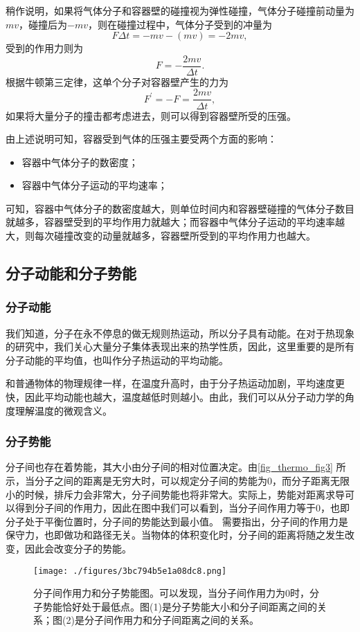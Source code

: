 稍作说明，如果将气体分子和容器壁的碰撞视为弹性碰撞，气体分子碰撞前动量为$mv$，碰撞后为$-mv$，则在碰撞过程中，气体分子受到的冲量为$$F\Delta t=-mv-(mv)=-2mv,$$受到的作用力则为$$F=-\dfrac{2mv}{\Delta t}.$$根据牛顿第三定律，这单个分子对容器壁产生的力为$$F^\prime=-F=\dfrac{2mv}{\Delta t},$$如果将大量分子的撞击都考虑进去，则可以得到容器壁所受的压强。

由上述说明可知，容器受到气体的压强主要受两个方面的影响：
\begin{itemize}
\item 容器中气体分子的数密度；
\item 容器中气体分子运动的平均速率；
\end{itemize}
可知，容器中气体分子的数密度越大，则单位时间内和容器壁碰撞的气体分子数目就越多，容器壁受到的平均作用力就越大；而容器中气体分子运动的平均速率越大，则每次碰撞改变的动量就越多，容器壁所受到的平均作用力也越大。
\subsection{分子动能和分子势能}
\subsubsection{分子动能}
我们知道，分子在永不停息的做无规则热运动，所以分子具有动能。在对于热现象的研究中，我们关心大量分子集体表现出来的热学性质，因此，这里重要的是所有分子动能的平均值，也叫作分子热运动的平均动能。

和普通物体的物理规律一样，在温度升高时，由于分子热运动加剧，平均速度更快，因此平均动能也越大，温度越低时则越小。由此，我们可以从分子动力学的角度理解温度的微观含义。

\subsubsection{分子势能}
分子间也存在着势能，其大小由分子间的相对位置决定。由\autoref{fig_thermo_fig3} 所示，当分子之间的距离是无穷大时，可以规定分子间的势能为$0$，而分子距离无限小的时候，排斥力会非常大，分子间势能也将非常大。实际上，势能对距离求导可以得到分子间的作用力，因此在图中我们可以看到，当分子间作用力等于$0$，也即分子处于平衡位置时，分子间的势能达到最小值。
需要指出，分子间的作用力是保守力，也即做功和路径无关。当物体的体积变化时，分子间的距离将随之发生改变，因此会改变分子的势能。

\begin{figure}[ht]
\centering
\texttt{[image: ./figures/3bc794b5e1a08dc8.png]}
\caption{分子间作用力和分子势能图。可以发现，当分子间作用力为$0$时，分子势能恰好处于最低点。图(1)是分子势能大小和分子间距离之间的关系；图(2)是分子间作用力和分子间距离之间的关系。} \label{fig_thermo_fig3}
\end{figure}



